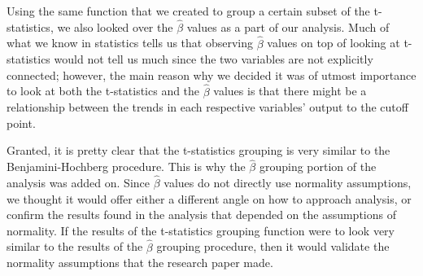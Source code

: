 \par Using the same function that we created to group a certain subset of the 
t-statistics, we also looked over the $\hat{\beta}$ values as a part of our 
analysis. Much of what we know in statistics tells us that observing 
$\hat{\beta}$ values on top of looking at t-statistics would not tell us much 
since the two variables are not explicitly connected; however, the main reason 
why we decided it was of utmost importance to look at both the t-statistics 
and the $\hat{\beta}$ values is that there might be a relationship between the 
trends in each respective variables' output to the cutoff point. 

\par Granted, it is pretty clear that the t-statistics grouping is very similar
to the Benjamini-Hochberg procedure. This is why the $\hat{\beta}$ grouping 
portion of the analysis was added on. Since $\hat{\beta}$ values do not 
directly use normality assumptions, we thought it would offer either a 
different angle on how to approach analysis, or confirm the results found in 
the analysis that depended on the assumptions of normality. If the results of
the t-statistics grouping function were to look very similar to the results of
the $\hat{\beta}$ grouping procedure, then it would validate the normality 
assumptions that the research paper made. 
